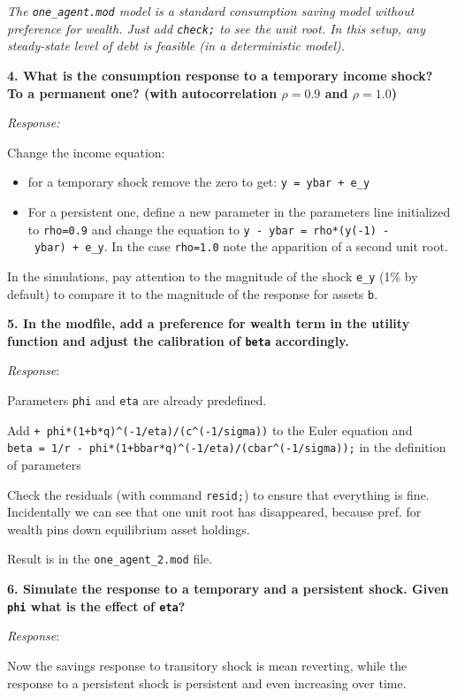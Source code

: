 \documentclass[
  letterpaper,
  DIV=11,
  numbers=noendperiod]{scrartcl}
\providecommand{\tightlist}{%
  \setlength{\itemsep}{0pt}\setlength{\parskip}{0pt}}\usepackage{longtable,booktabs,array}
\begin{document}
\emph{The \texttt{one\_agent.mod} model is a standard consumption saving
model without preference for wealth. Just add \texttt{check;} to see the
unit root. In this setup, any steady-state level of debt is feasible (in
a deterministic model).}

\textbf{4. What is the consumption response to a temporary income shock?
To a permanent one? (with autocorrelation \(\rho=0.9\) and
\(\rho=1.0\))}

\emph{Response:}

Change the income equation:

\begin{itemize}
\tightlist
\item
  for a temporary shock remove the zero to get:
  \texttt{y\ =\ ybar\ +\ e\_y}
\item
  For a persistent one, define a new parameter in the parameters line
  initialized to \texttt{rho=0.9} and change the equation to
  \texttt{y\ -\ ybar\ =\ rho*(y(-1)\ -\ ybar)\ +\ e\_y}. In the case
  \texttt{rho=1.0} note the apparition of a second unit root.
\end{itemize}

In the simulations, pay attention to the magnitude of the shock
\texttt{e\_y} (1\% by default) to compare it to the magnitude of the
response for assets \texttt{b}.

\textbf{5. In the modfile, add a preference for wealth term in the
utility function and adjust the calibration of \texttt{beta}
accordingly.}

\emph{Response}:

Parameters \texttt{phi} and \texttt{eta} are already predefined.

Add \texttt{+\ phi*(1+b*q)\^{}(-1/eta)/(c\^{}(-1/sigma))} to the Euler
equation and
\texttt{beta\ =\ 1/r\ -\ phi*(1+bbar*q)\^{}(-1/eta)/(cbar\^{}(-1/sigma));}
in the definition of parameters

Check the residuals (with command \texttt{resid;}) to ensure that
everything is fine. Incidentally we can see that one unit root has
disappeared, because pref. for wealth pins down equilibrium asset
holdings.

Result is in the \texttt{one\_agent\_2.mod} file.

\textbf{6. Simulate the response to a temporary and a persistent shock.
Given \texttt{phi} what is the effect of \texttt{eta}?}

\emph{Response}:

Now the savings response to transitory shock is mean reverting, while
the response to a persistent shock is persistent and even increasing
over time.
\end{document}
